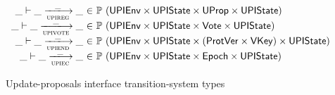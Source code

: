 \begin{figure}[htb]
\begin{equation*}
\begin{array}{r@{~\in~}l}
      \_ \vdash \_ \trans{upireg}{\_} \_ &
      \powerset (\UPIEnv \times \UPIState \times \UProp \times \UPIState)\\
      \_ \vdash \_ \trans{upivote}{\_} \_ &
      \powerset (\UPIEnv \times \UPIState \times \Vote \times \UPIState)\\
      \_ \vdash \_ \trans{upiend}{\_} \_ &
      \powerset (\UPIEnv \times \UPIState
      \times (\ProtVer \times \VKey) \times \UPIState)\\
      \_ \vdash \_ \trans{upiec}{\_} \_ &
      \powerset (\UPIEnv \times \UPIState \times \Epoch \times \UPIState)
    \end{array}
  \end{equation*}
  \caption{Update-proposals interface transition-system types}
  \label{fig:ts-types:upi}
\end{figure}

